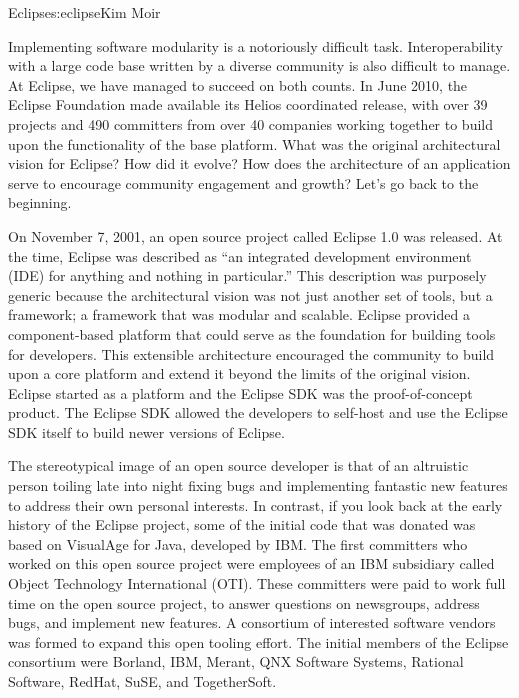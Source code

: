 \begin{aosachapter}{Eclipse}{s:eclipse}{Kim Moir}

Implementing software modularity is a notoriously difficult task.
Interoperability with a large code base written by a diverse community
is also difficult to manage. At Eclipse, we have managed to succeed on
both counts. In June 2010, the Eclipse Foundation made available its
Helios coordinated release, with over 39 projects and 490 committers
from over 40 companies working together to build upon the
functionality of the base platform. What was the original
architectural vision for Eclipse?  How did it evolve? How does the
architecture of an application serve to encourage community engagement
and growth? Let's go back to the beginning.

On November 7, 2001, an open source project called Eclipse 1.0 was
released. At the time, Eclipse was described as ``an integrated
development environment (IDE) for anything and nothing in
particular.''  This description was purposely generic because the
architectural vision was not just another set of tools, but a
framework; a framework that was modular and scalable. Eclipse provided
a component-based platform that could serve as the foundation for
building tools for developers. This extensible architecture encouraged
the community to build upon a core platform and extend it beyond the
limits of the original vision. Eclipse started as a platform and the
Eclipse SDK was the proof-of-concept product.  The Eclipse SDK allowed
the developers to self-host and use the Eclipse SDK itself to build
newer versions of Eclipse.

The stereotypical image of an open source developer is that of an
altruistic person toiling late into night fixing bugs and implementing
fantastic new features to address their own personal interests. In
contrast, if you look back at the early history of the Eclipse
project, some of the initial code that was donated was based on
VisualAge for Java, developed by IBM\@. The first committers who worked
on this open source project were employees of an IBM subsidiary
called Object Technology International (OTI). These committers were
paid to work full time on the open source project, to answer questions
on newsgroups, address bugs, and implement new features. A consortium
of interested software vendors was formed to expand this open tooling
effort. The initial members of the Eclipse consortium were Borland,
IBM, Merant, QNX Software Systems, Rational Software, RedHat, SuSE,
and TogetherSoft.


\end{aosachapter}
